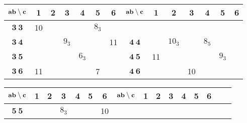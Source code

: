 \documentclass[a4paper,12pt]{report}
\begin{document}
\begin{flushleft}
\begin{tabular}{|c|c|c|c|c|c|c||c|c|c|c|c|c|c|}\hline
$\small \textbf{ab} \setminus \textbf{c}$  & \textbf{1} & \textbf{2} & \textbf{3} & \textbf{4} & \textbf{5} & \textbf{6} &  $\small \textbf{ab} \setminus \textbf{c}$  & \textbf{1} & \textbf{2} & \textbf{3} & \textbf{4} & \textbf{5} & \textbf{6} \\
\hline

$\textbf{3}\:\textbf{3}$ & 10 & \hspace{6mm}  & \hspace{6mm} & \hspace{6mm} & $8_{3}$& \hspace{6mm} &  &
\hspace{6mm} & \hspace{6mm} & \hspace{6mm} & \hspace{6mm} & \hspace{6mm} & \hspace{6mm} \\ \hline

$\textbf{3}\:\textbf{4}$ & \hspace{6mm} &  & $9_{3}$&  & &11 & $\textbf{4}\:\textbf{4}$ &  & $10_{3}$ & &
$8_{5}$& & \\ \hline

$\textbf{3}\:\textbf{5}$ &  &  & & $6_{3}$ & \hspace{6mm} &  & $\textbf{4}\:\textbf{5}$ & 11 & & & & $9_{3}$ & \\
\hline

$\textbf{3}\:\textbf{6}$ & 11 &  & &   & 7& & $\textbf{4}\:\textbf{6}$ &  &  & 10 & & & \\ \hline

\end{tabular}

\begin{tabular}{|c|c|c|c|c|c|c||c|c|c|c|c|c|c|c|c|}\hline
$\small \textbf{ab} \setminus \textbf{c}$  & \textbf{1} & \textbf{2} & \textbf{3} & \textbf{4} & \textbf{5} & \textbf{6} &  $\small \textbf{ab} \setminus \textbf{c}$  & \textbf{1} & \textbf{2} & \textbf{3} & \textbf{4} & \textbf{5} & \textbf{6}  \\
\hline

$\textbf{5}\:\textbf{5}$ & \hspace{6mm} & \hspace{6mm} & $8_{3}$ & \hspace{6mm} & \hspace{6mm} & 10  & & \hspace{6mm} & \hspace{6mm} & \hspace{6mm} & \hspace{6mm} & \hspace{6mm} & \hspace{6mm}  \\
\hline


\end{tabular}
\end{flushleft}
\end{document}
